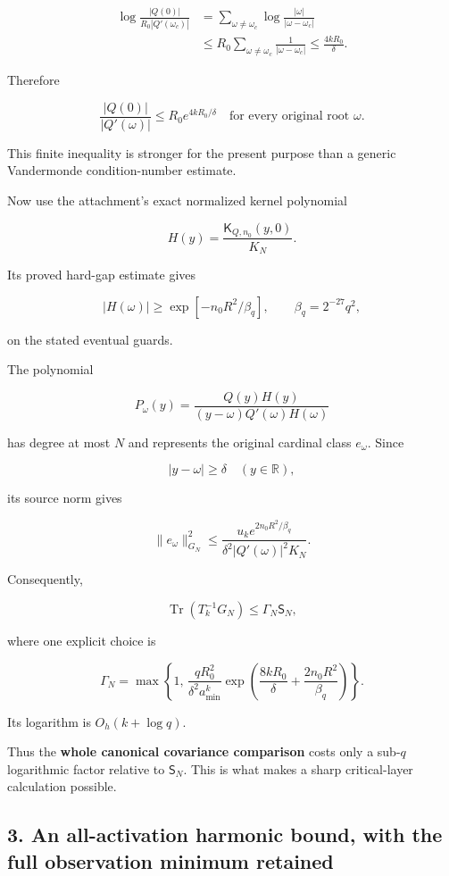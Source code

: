 \documentclass[11pt]{article}
\begin{document}
\[
\begin{aligned}
\log\frac{|Q(0)|}{R_0|Q'(\omega_c)|}
&=
\sum_{\omega\ne\omega_c}
\log\frac{|\omega|}{|\omega-\omega_c|}\\
&\le
R_0\sum_{\omega\ne\omega_c}
\frac1{|\omega-\omega_c|}
\le\frac{4kR_0}{\delta}.
\end{aligned}
\]

Therefore

\[
\boxed{
\frac{|Q(0)|}{|Q'(\omega)|}
\le R_0e^{4kR_0/\delta}
\quad\text{for every original root }\omega.
}
\tag{11}
\]

This finite inequality is stronger for the present purpose than a generic Vandermonde condition-number estimate.

Now use the attachment's exact normalized kernel polynomial

\[
H(y)=\frac{\mathsf K_{Q,n_0}(y,0)}{K_N}.
\]

Its proved hard-gap estimate gives

\[
|H(\omega)|\ge
\exp[-n_0R^2/\beta_q],
\qquad \beta_q=2^{-27}q^2,
\]

on the stated eventual guards.

The polynomial

\[
P_\omega(y)
=
\frac{Q(y)H(y)}
{(y-\omega)Q'(\omega)H(\omega)}
\]

has degree at most \(N\) and represents the original cardinal class \(e_\omega\). Since

\[
|y-\omega|\ge\delta
\quad(y\in\mathbb R),
\]

its source norm gives

\[
\|e_\omega\|_{G_N}^2
\le
\frac{u_ke^{2n_0R^2/\beta_q}}
{\delta^2|Q'(\omega)|^2K_N}.
\]

Consequently,

\[
\boxed{
\operatorname{Tr}(T_k^{-1}G_N)
\le \Gamma_N\mathsf S_N,
}
\tag{12}
\]

where one explicit choice is

\[
\boxed{
\Gamma_N=
\max\left\{
1,\,
\frac{qR_0^2}{\delta^2a_{\min}^k}
\exp\left(
\frac{8kR_0}{\delta}
+\frac{2n_0R^2}{\beta_q}
\right)
\right\}.
}
\tag{13}
\]

Its logarithm is \(O_h(k+\log q)\).

Thus the \textbf{whole canonical covariance comparison} costs only a sub-\(q\) logarithmic factor relative to \(\mathsf S_N\). This is what makes a sharp critical-layer calculation possible.

\subsection{3. An all-activation harmonic bound, with the full observation minimum retained}\label{an-all-activation-harmonic-bound-with-the-full-observation-minimum-retained}
\end{document}
